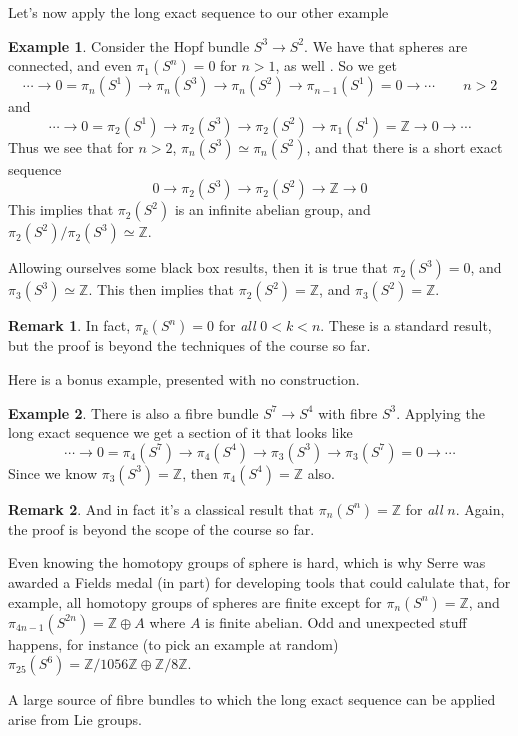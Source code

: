 \documentclass{tufte-handout}
\def\ZZ{\mathbb{Z}}
\newcommand{\lecturenum}[1]{\marginnote{\color{red}Lecture #1}}
\theoremstyle{definition}
\newtheorem{example}{Example}
\newtheorem*{rem}{Remark}
\begin{document}
Let's now apply the long exact sequence to our other example

\begin{example}
Consider the Hopf bundle $S^3\to S^2$. We have that spheres are connected, and even $\pi_1(S^n) = 0$ for $n>1$, as well . So we get
\[
 \cdots \to 0 = \pi_n(S^1) \to \pi_n(S^3) \to \pi_n(S^2) \to \pi_{n-1}(S^1) = 0 \to \cdots \qquad n>2
\]
and
\[
\cdots \to 0=\pi_2(S^1) \to \pi_2(S^3) \to \pi_2(S^2) \to \pi_1(S^1) = \ZZ \to 0 \to \cdots
\]
Thus we see that for $n>2$, $\pi_n(S^3) \simeq \pi_n(S^2)$, and that there is a short exact sequence 
\[
0\to \pi_2(S^3) \to \pi_2(S^2) \to \ZZ \to 0
\]
This implies that $\pi_2(S^2)$ is an infinite abelian group, and $\pi_2(S^2)/ \pi_2(S^3) \simeq \ZZ$.
\end{example}
Allowing ourselves some black box results, then it is true that $\pi_2(S^3) = 0$, and $\pi_3(S^3) \simeq \ZZ$. This then implies that $\pi_2(S^2) = \ZZ$, and $\pi_3(S^2) = \ZZ$.

\begin{rem}
In fact, $\pi_k(S^n) = 0$ for \emph{all} $0<k<n$. These is a standard result, but the proof is beyond the techniques of the course so far.
\end{rem} 

Here is a bonus example, presented with no construction.
\begin{example}
There is also a fibre bundle $S^7\to S^4$ with fibre $S^3$. Applying the long exact sequence we get a section of it that looks like
\[
\cdots \to 0=\pi_4(S^7) \to \pi_4(S^4) \to \pi_3(S^3) \to \pi_3(S^7) = 0 \to \cdots 
\]
Since we know $\pi_3(S^3) = \ZZ$, then $\pi_4(S^4) = \ZZ$ also.
\end{example}

\begin{rem}
And in fact it's a classical result that $\pi_n(S^n) = \ZZ$ for \emph{all} $n$. Again, the proof is beyond the scope of the course so far.
\end{rem}

Even knowing the homotopy groups of sphere is hard, which is why Serre was awarded a Fields medal (in part) for developing tools that could calulate that, for example, all homotopy groups of spheres are finite except for $\pi_n(S^n)=\ZZ$, and $\pi_{4n-1}(S^{2n}) = \ZZ \oplus A$ where $A$ is finite abelian. Odd and unexpected stuff happens, for instance (to pick an example at random) $\pi_{25}(S^6) = \ZZ/{1056 \ZZ} \oplus \ZZ/8\ZZ$.

A\lecturenum{19} large source of fibre bundles to which the long exact sequence can be applied arise from Lie groups.
\end{document}
